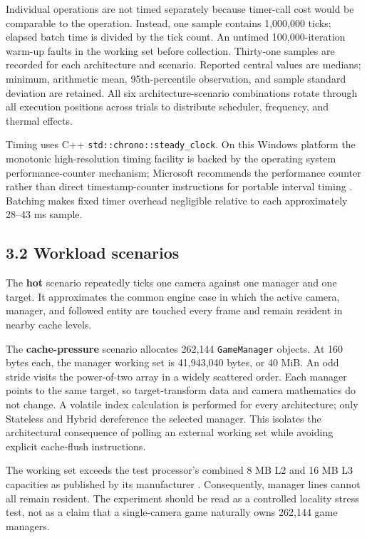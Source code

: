 Individual operations are not timed separately because timer-call cost would be comparable to the operation. Instead, one sample contains 1,000,000 ticks; elapsed batch time is divided by the tick count. An untimed 100,000-iteration warm-up faults in the working set before collection. Thirty-one samples are recorded for each architecture and scenario. Reported central values are medians; minimum, arithmetic mean, 95th-percentile observation, and sample standard deviation are retained. All six architecture-scenario combinations rotate through all execution positions across trials to distribute scheduler, frequency, and thermal effects.

Timing uses C++ \texttt{std::chrono::steady_clock}. On this Windows platform the monotonic high-resolution timing facility is backed by the operating system performance-counter mechanism; Microsoft recommends the performance counter rather than direct timestamp-counter instructions for portable interval timing \cite{microsoftqpc}. Batching makes fixed timer overhead negligible relative to each approximately 28–43 ms sample.

\subsection{3.2 Workload scenarios}

The \textbf{hot} scenario repeatedly ticks one camera against one manager and one target. It approximates the common engine case in which the active camera, manager, and followed entity are touched every frame and remain resident in nearby cache levels.

The \textbf{cache-pressure} scenario allocates 262,144 \texttt{GameManager} objects. At 160 bytes each, the manager working set is 41,943,040 bytes, or 40 MiB. An odd stride visits the power-of-two array in a widely scattered order. Each manager points to the same target, so target-transform data and camera mathematics do not change. A volatile index calculation is performed for every architecture; only Stateless and Hybrid dereference the selected manager. This isolates the architectural consequence of polling an external working set while avoiding explicit cache-flush instructions.

The working set exceeds the test processor's combined 8 MB L2 and 16 MB L3 capacities as published by its manufacturer \cite{amdspec}. Consequently, manager lines cannot all remain resident. The experiment should be read as a controlled locality stress test, not as a claim that a single-camera game naturally owns 262,144 game managers.

